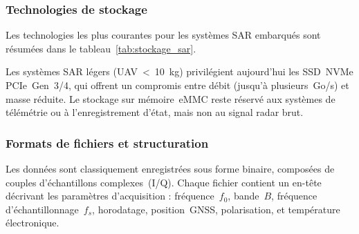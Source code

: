 \subsubsection{Technologies de stockage}

Les technologies les plus courantes pour les systèmes SAR embarqués sont résumées dans le tableau~\ref{tab:stockage_sar}.

\begin{table}[h!]
\centering
\caption{Comparatif des technologies de stockage pour applications SAR embarquées.}
\label{tab:stockage_sar}
\renewcommand{\arraystretch}{1.1}
\end{table}

Les systèmes SAR légers (UAV~<~10~kg) privilégient aujourd’hui les SSD~NVMe PCIe~Gen~3/4, qui offrent un compromis entre débit (jusqu’à plusieurs~Go/s) et masse réduite. Le stockage sur mémoire~eMMC reste réservé aux systèmes de télémétrie ou à l’enregistrement d’état, mais non au signal radar brut.

\subsubsection{Formats de fichiers et structuration}

Les données sont classiquement enregistrées sous forme binaire, composées de couples d’échantillons complexes~(I/Q). Chaque fichier contient un en-tête décrivant les paramètres d’acquisition : fréquence~$f_0$, bande~$B$, fréquence d’échantillonnage~$f_s$, horodatage, position~GNSS, polarisation, et température électronique.

